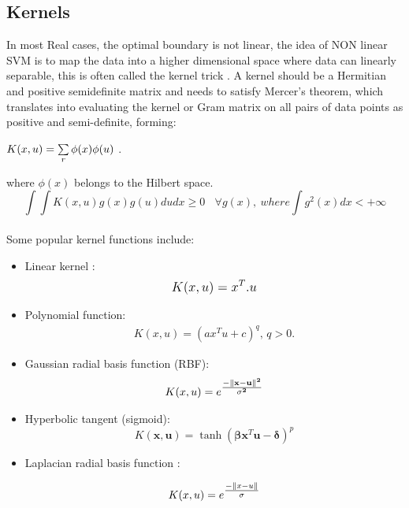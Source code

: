 \subsection{Kernels}

In most Real cases, the optimal boundary is not linear,  the idea of NON linear SVM is to map the data into a higher dimensional space where data can linearly separable, this is often called the kernel trick . A kernel should be a Hermitian and positive semidefinite matrix and needs to satisfy Mercer’s theorem, which translates into evaluating the kernel or Gram matrix on all pairs of data points as positive and semi-definite, forming:

$K(\small{x,u})=\sum\limits_{r} \phi(x)\phi(u) $ .

where $\phi(x) $ belongs to the Hilbert space.
\newline
$$\int \int K(x,u) g(x) g(u) du dx \geq 0 \ \ \ \ \forall g(x) , \ where \int g^2(x) dx < +\infty$$
\\
\newline 
Some popular kernel functions include: 


\begin{itemize}

  \item  Linear kernel  : 
  \begin{align*}
  \mathlarger {K(x,u)=  x^{T}.u  }
   \end{align*}
  \item Polynomial function: 
  \begin{align*}
  K(x,u)=(ax^{T}u + c)^{q} ,\, q>0.
  \end{align*}
  \item Gaussian radial basis function (RBF): 
\begin{align*} 
 K(x,u) = e^{\mathlarger{\frac{\mathbf{-\| x -  u\|^2}}{\mathbf{\sigma^2} } }}
\end{align*}
   
  \item  Hyperbolic tangent (sigmoid):
    \begin{equation}
      K(\mathbf x, \mathbf u) = \tanh(\mathbf {\beta} \mathbf x^{T} \mathbf u - \mathbf{\delta})^p
    \end{equation}
    
    \item Laplacian radial basis function : 
    
    \begin{align*} 
      K(x,u) = e^{\mathlarger{\frac{-\| x -  u\|}{\sigma} } }
     \end{align*}
    
\end{itemize}

